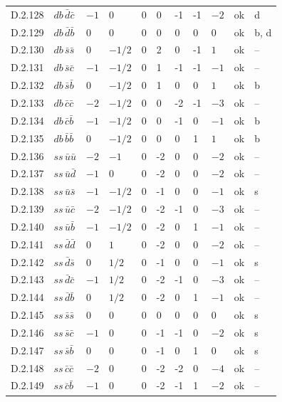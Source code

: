 {\begin{longtable}{@{}llllllllll>{\raggedright\arraybackslash}p{2.0cm}@{}}
D.2.128 & $db\,\bar{d}\bar{c}$ & $-1$ & $0$ & $0$ & 0 & -1 & -1 & $-2$ & ok & d \\
D.2.129 & $db\,\bar{d}\bar{b}$ & $0$ & $0$ & $0$ & 0 & 0 & 0 & $0$ & ok & b, d \\
D.2.130 & $db\,\bar{s}\bar{s}$ & $0$ & $-1/2$ & $0$ & 2 & 0 & -1 & $1$ & ok & -- \\
D.2.131 & $db\,\bar{s}\bar{c}$ & $-1$ & $-1/2$ & $0$ & 1 & -1 & -1 & $-1$ & ok & -- \\
D.2.132 & $db\,\bar{s}\bar{b}$ & $0$ & $-1/2$ & $0$ & 1 & 0 & 0 & $1$ & ok & b \\
D.2.133 & $db\,\bar{c}\bar{c}$ & $-2$ & $-1/2$ & $0$ & 0 & -2 & -1 & $-3$ & ok & -- \\
D.2.134 & $db\,\bar{c}\bar{b}$ & $-1$ & $-1/2$ & $0$ & 0 & -1 & 0 & $-1$ & ok & b \\
D.2.135 & $db\,\bar{b}\bar{b}$ & $0$ & $-1/2$ & $0$ & 0 & 0 & 1 & $1$ & ok & b \\
D.2.136 & $ss\,\bar{u}\bar{u}$ & $-2$ & $-1$ & $0$ & -2 & 0 & 0 & $-2$ & ok & -- \\
D.2.137 & $ss\,\bar{u}\bar{d}$ & $-1$ & $0$ & $0$ & -2 & 0 & 0 & $-2$ & ok & -- \\
D.2.138 & $ss\,\bar{u}\bar{s}$ & $-1$ & $-1/2$ & $0$ & -1 & 0 & 0 & $-1$ & ok & s \\
D.2.139 & $ss\,\bar{u}\bar{c}$ & $-2$ & $-1/2$ & $0$ & -2 & -1 & 0 & $-3$ & ok & -- \\
D.2.140 & $ss\,\bar{u}\bar{b}$ & $-1$ & $-1/2$ & $0$ & -2 & 0 & 1 & $-1$ & ok & -- \\
D.2.141 & $ss\,\bar{d}\bar{d}$ & $0$ & $1$ & $0$ & -2 & 0 & 0 & $-2$ & ok & -- \\
D.2.142 & $ss\,\bar{d}\bar{s}$ & $0$ & $1/2$ & $0$ & -1 & 0 & 0 & $-1$ & ok & s \\
D.2.143 & $ss\,\bar{d}\bar{c}$ & $-1$ & $1/2$ & $0$ & -2 & -1 & 0 & $-3$ & ok & -- \\
D.2.144 & $ss\,\bar{d}\bar{b}$ & $0$ & $1/2$ & $0$ & -2 & 0 & 1 & $-1$ & ok & -- \\
D.2.145 & $ss\,\bar{s}\bar{s}$ & $0$ & $0$ & $0$ & 0 & 0 & 0 & $0$ & ok & s \\
D.2.146 & $ss\,\bar{s}\bar{c}$ & $-1$ & $0$ & $0$ & -1 & -1 & 0 & $-2$ & ok & s \\
D.2.147 & $ss\,\bar{s}\bar{b}$ & $0$ & $0$ & $0$ & -1 & 0 & 1 & $0$ & ok & s \\
D.2.148 & $ss\,\bar{c}\bar{c}$ & $-2$ & $0$ & $0$ & -2 & -2 & 0 & $-4$ & ok & -- \\
D.2.149 & $ss\,\bar{c}\bar{b}$ & $-1$ & $0$ & $0$ & -2 & -1 & 1 & $-2$ & ok & -- \\

\end{longtable}}
